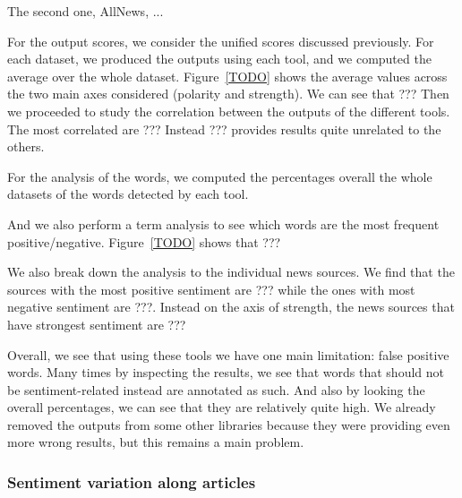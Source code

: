 The second one, AllNews, ...


For the output scores, we consider the unified scores discussed previously. For each dataset, we produced the outputs using each tool, and we computed the average over the whole dataset.
Figure~\ref{TODO} shows the average values across the two main axes considered (polarity and strength). We can see that ???
Then we proceeded to study the correlation between the outputs of the different tools.
The most correlated are ???
Instead ??? provides results quite unrelated to the others.

For the analysis of the words, we computed the percentages overall the whole datasets of the words detected by each tool.

And we also perform a term analysis to see which words are the most frequent positive/negative. Figure~\ref{TODO} shows that ???

We also break down the analysis to the individual news sources.
We find that the sources with the most positive sentiment are ??? while the ones with most negative sentiment are ???.
Instead on the axis of strength, the news sources that have strongest sentiment are ???


Overall, we see that using these tools we have one main limitation: false positive words. Many times by inspecting the results, we see that words that should not be sentiment-related instead are annotated as such. And also by looking the overall percentages, we can see that they are relatively quite high.
We already removed the outputs from some other libraries because they were providing even more wrong results, but this remains a main problem.



\subsubsection{\statusorange Sentiment variation along articles}

